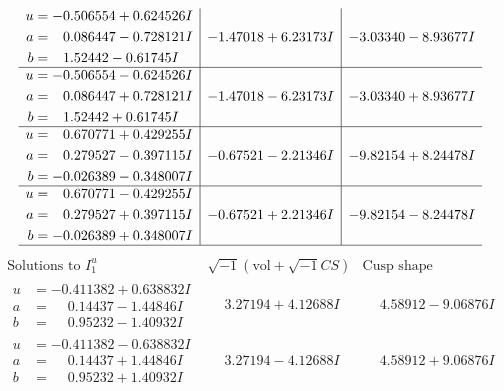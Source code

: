 \documentclass[1p]{elsarticle_modified}
\theoremstyle{definition}
\newcommand{\I}{\sqrt{-1}}
\begin{document}
$$\begin{array}{c|c|c}
\begin{aligned}
u &= -0.506554 + 0.624526 I \\
a &= \phantom{-}0.086447 - 0.728121 I \\
b &= \phantom{-}1.52442 - 0.61745 I\end{aligned}
 & -1.47018 + 6.23173 I & -3.03340 - 8.93677 I \\ \hline\begin{aligned}
u &= -0.506554 - 0.624526 I \\
a &= \phantom{-}0.086447 + 0.728121 I \\
b &= \phantom{-}1.52442 + 0.61745 I\end{aligned}
 & -1.47018 - 6.23173 I & -3.03340 + 8.93677 I \\ \hline\begin{aligned}
u &= \phantom{-}0.670771 + 0.429255 I \\
a &= \phantom{-}0.279527 - 0.397115 I \\
b &= -0.026389 - 0.348007 I\end{aligned}
 & -0.67521 - 2.21346 I & -9.82154 + 8.24478 I \\ \hline\begin{aligned}
u &= \phantom{-}0.670771 - 0.429255 I \\
a &= \phantom{-}0.279527 + 0.397115 I \\
b &= -0.026389 + 0.348007 I\end{aligned}
 & -0.67521 + 2.21346 I & -9.82154 - 8.24478 I\\
 \hline 
 \end{array}$$\newpage$$\begin{array}{c|c|c}  
\text{Solutions to }I^u_{1}& \I (\text{vol} + \sqrt{-1}CS) & \text{Cusp shape}\\
 \hline 
\begin{aligned}
u &= -0.411382 + 0.638832 I \\
a &= \phantom{-}0.14437 - 1.44846 I \\
b &= \phantom{-}0.95232 - 1.40932 I\end{aligned}
 & \phantom{-}3.27194 + 4.12688 I & \phantom{-}4.58912 - 9.06876 I \\ \hline\begin{aligned}
u &= -0.411382 - 0.638832 I \\
a &= \phantom{-}0.14437 + 1.44846 I \\
b &= \phantom{-}0.95232 + 1.40932 I\end{aligned}
 & \phantom{-}3.27194 - 4.12688 I & \phantom{-}4.58912 + 9.06876 I \\ \hline\begin{aligned}

\end{aligned}
\end{array}$$
\end{document}
